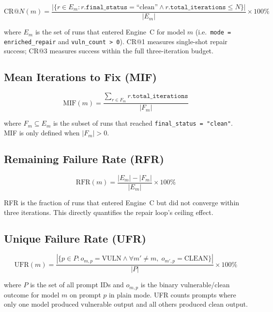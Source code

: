 \documentclass[12pt,a4paper]{report}
\begin{document}
\begin{equation}
\mathrm{CR@}N(m) =
  \frac{|\{r \in E_m : r.\texttt{final\_status} = \text{``clean''}
          \wedge r.\texttt{total\_iterations} \leq N\}|}
       {|E_m|}
  \times 100\%
\label{eq:crn}
\end{equation}

where $E_m$ is the set of runs that entered Engine~C for model $m$ (i.e.\
\texttt{mode = enriched\_repair} and \texttt{vuln\_count > 0}). CR@1 measures
single-shot repair success; CR@3 measures success within the full three-iteration
budget.

\subsection{Mean Iterations to Fix (MIF)}
\label{ssec:mif}

\begin{equation}
\mathrm{MIF}(m) =
  \frac{\sum_{r \in F_m} r.\texttt{total\_iterations}}{|F_m|}
\label{eq:mif}
\end{equation}

where $F_m \subseteq E_m$ is the subset of runs that reached
\texttt{final\_status = "clean"}. MIF is only defined when $|F_m| > 0$.

\subsection{Remaining Failure Rate (RFR)}
\label{ssec:rfr}

\begin{equation}
\mathrm{RFR}(m) =
  \frac{|E_m| - |F_m|}{|E_m|}
  \times 100\%
\label{eq:rfr}
\end{equation}

RFR is the fraction of runs that entered Engine~C but did not converge within
three iterations. This directly quantifies the repair loop's ceiling effect.

\subsection{Unique Failure Rate (UFR)}
\label{ssec:ufr}

\begin{equation}
\mathrm{UFR}(m) =
  \frac{|\{p \in P : o_{m,p} = \text{VULN}
          \wedge \forall m' \neq m,\; o_{m',p} = \text{CLEAN}\}|}{|P|}
  \times 100\%
\label{eq:ufr}
\end{equation}

where $P$ is the set of all prompt IDs and $o_{m,p}$ is the binary vulnerable/clean
outcome for model $m$ on prompt $p$ in plain mode. UFR counts prompts where only
one model produced vulnerable output and all others produced clean output.
\end{document}
